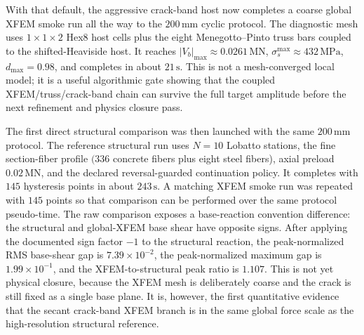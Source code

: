 With that default, the aggressive crack-band host now completes a coarse global
XFEM smoke run all the way to the \(200\,\mathrm{mm}\) cyclic protocol.  The
diagnostic mesh uses \(1\times1\times2\) Hex8 host cells plus the eight
Menegotto--Pinto truss bars coupled to the shifted-Heaviside host.  It reaches
\(|V_b|_{\max}\approx0.0261\,\mathrm{MN}\),
\(\sigma_s^{\max}\approx432\,\mathrm{MPa}\), \(d_{\max}=0.98\), and completes
in about \(21\,\mathrm{s}\).  This is not a mesh-converged local model; it is a
useful algorithmic gate showing that the coupled XFEM/truss/crack-band chain
can survive the full target amplitude before the next refinement and physics
closure pass.

The first direct structural comparison was then launched with the same
\(200\,\mathrm{mm}\) protocol.  The reference structural run uses
\(N=10\) Lobatto stations, the fine section-fiber profile
\((336\) concrete fibers plus eight steel fibers), axial preload
\(0.02\,\mathrm{MN}\), and the declared reversal-guarded continuation policy.
It completes with \(145\) hysteresis points in about \(243\,\mathrm{s}\).  A
matching XFEM smoke run was repeated with \(145\) points so that comparison can
be performed over the same protocol pseudo-time.  The raw comparison exposes a
base-reaction convention difference: the structural and global-XFEM base shear
have opposite signs.  After applying the documented sign factor
\(-1\) to the structural reaction, the peak-normalized RMS base-shear gap is
\(7.39\times10^{-2}\), the peak-normalized maximum gap is
\(1.99\times10^{-1}\), and the XFEM-to-structural peak ratio is \(1.107\).
This is not yet physical closure, because the XFEM mesh is deliberately coarse
and the crack is still fixed as a single base plane.  It is, however, the first
quantitative evidence that the secant crack-band XFEM branch is in the same
global force scale as the high-resolution structural reference.

